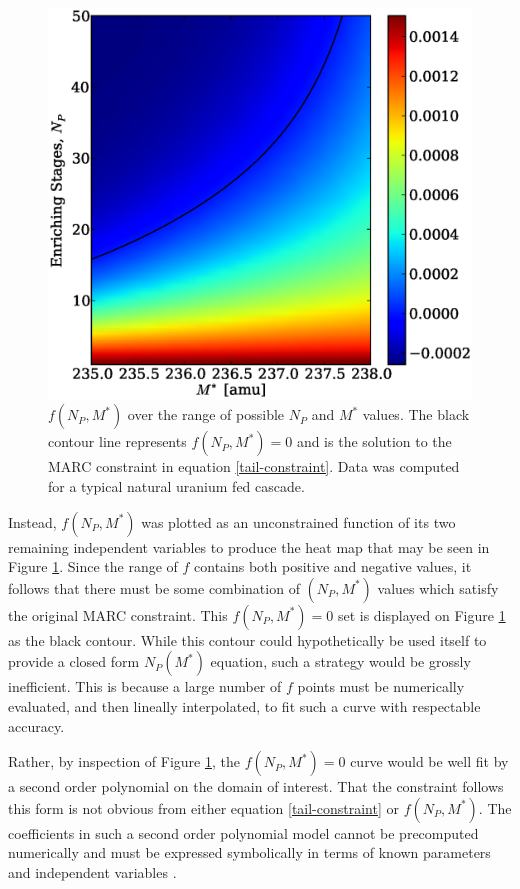 \documentclass[preprint,12pt]{elsarticle}
\begin{document}
\begin{figure}[htpb]
\begin{center}
\includegraphics[scale=0.5]{np_constraint.eps}
\caption{$f(N_P, M^*)$ over the range of possible $N_P$ and $M^*$ values.  The black
contour line represents $f(N_P, M^*)=0$ and is the solution to the MARC constraint
in equation \ref{tail-constraint}. 
Data was computed for a typical natural uranium fed cascade.}
\label{np_constraint_fig}
\end{center}
\end{figure}

Instead, $f(N_P,M^*)$ was plotted as an unconstrained function of its two remaining 
independent variables to produce the heat map that may be seen in Figure 
\ref{np_constraint_fig}.  Since the range of $f$ contains both positive and negative
values, it follows that there must be some combination of $(N_P,M^*)$ values which
satisfy the original MARC constraint.  This $f(N_P, M^*)=0$ set is displayed on Figure 
\ref{np_constraint_fig} as the black contour.  While this contour could hypothetically
be used itself to provide a closed form $N_P(M^*)$ equation, such a strategy would 
be grossly inefficient.  This is because a large number of $f$ points must be 
numerically evaluated, and then lineally interpolated, to fit such a curve with
respectable accuracy.

Rather, by inspection of Figure \ref{np_constraint_fig}, the $f(N_P, M^*)=0$ curve 
would be well fit by a second order polynomial on the domain of interest.
That the constraint follows this form is not obvious from either equation 
\ref{tail-constraint} or $f(N_P,M^*)$.  The coefficients in 
such a second order polynomial model cannot be precomputed  numerically and must be 
expressed symbolically in terms of known parameters and independent variables 
\cite{Sacks:1989:ASS:1623755.1623823}.
\end{document}
